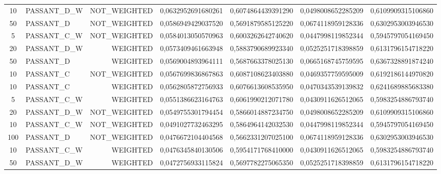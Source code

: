 \begin{table}[H]
{\begin{tabular}{ c l r c c c c }
	10 & PASSANT\_D\_W & NOT\_WEIGHTED & 0,0632952691680261 & 0,6074864439391290 & 0,0498008652285209 & 0,6109909315106860 \\
	
	50 &  PASSANT\_D & NOT\_WEIGHTED & 0,0586949429037520 & 0,5691879585125220 & 0,0674118959128336 & 0,6302953003946530 \\
	
	5 & PASSANT\_C\_W & NOT\_WEIGHTED & 0,0584013050570963 & 0,6003262642740620 & 0,0447998119852344 & 0,5945797054169450 \\
	
	20 & PASSANT\_D\_W &   WEIGHTED & 0,0573409461663948 & 0,5883790689923340 & 0,0525251718398859 & 0,6131796154718220 \\
	
	50 &  PASSANT\_D &   WEIGHTED & 0,0569004893964111 & 0,5687663378025130 & 0,0665168745759595 & 0,6367328891874240 \\
	
	10 &  PASSANT\_C & NOT\_WEIGHTED & 0,0567699836867863 & 0,6087108623403880 & 0,0469357759595009 & 0,6192186144970820 \\
	
	10 &  PASSANT\_C &   WEIGHTED & 0,0562805872756933 & 0,6076613608535950 & 0,0470343539139832 & 0,6241689885683380 \\
	
	5 & PASSANT\_C\_W &   WEIGHTED & 0,0551386623164763 & 0,6061990212071780 & 0,0430911626512065 & 0,5983254886793740 \\
	
	20 & PASSANT\_D\_W & NOT\_WEIGHTED & 0,0549755301794454 & 0,5866014887234750 & 0,0498008652285209 & 0,6109909315106860 \\
	
	10 & PASSANT\_C\_W & NOT\_WEIGHTED & 0,0491027732463295 & 0,5864964142032530 & 0,0447998119852344 & 0,5945797054169450 \\
	
	100 &  PASSANT\_D & NOT\_WEIGHTED & 0,0476672104404568 & 0,5662331207025100 & 0,0674118959128336 & 0,6302953003946530 \\
	
	10 & PASSANT\_C\_W &   WEIGHTED & 0,0476345840130506 & 0,5954171768410000 & 0,0430911626512065 & 0,5983254886793740 \\
	
	50 & PASSANT\_D\_W &   WEIGHTED & 0,0472756933115824 & 0,5697782275065350 & 0,0525251718398859 & 0,6131796154718220 \\
	

\end{tabular}}
\end{table}
